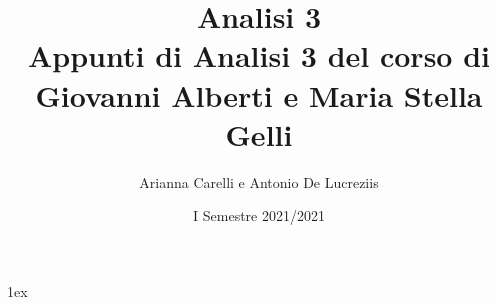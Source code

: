 \documentclass[a4paper, 12pt]{report}
\title{{\Huge Analisi 3}\\{\small Appunti di Analisi 3 del corso di Giovanni Alberti e Maria Stella Gelli}}
\author{Arianna Carelli e Antonio De Lucreziis}
\date{I Semestre 2021/2021}
\begin{document}
%
%
\parskip 1ex
\setlength{\parindent}{0pt}

\maketitle

\tableofcontents

\newpage








































\end{document}

